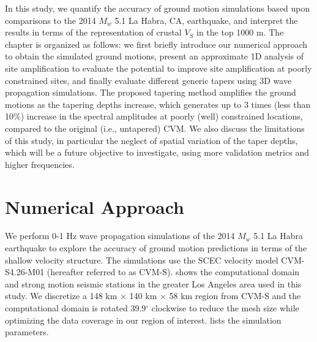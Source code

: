 In this study, we quantify the accuracy of ground motion simulations based upon comparisons to the 2014 $M_w$ 5.1 La Habra, CA, earthquake, and interpret the results in terms of the representation of crustal $V_S$ in the top 1000 m. The chapter is organized as follows: we first briefly introduce our numerical approach to obtain the simulated ground motions, present an approximate 1D analysis of site amplification to evaluate the potential to improve site amplification at poorly constrained sites, and finally evaluate different generic tapers using 3D wave propagation simulations. The proposed tapering method amplifies the ground motions as the tapering depths increase, which generates up to 3 times (less than 10\%) increase in the spectral amplitudes at poorly (well) constrained locations, compared to the original (i.e., untapered) CVM. We also discuss the limitations of this study, in particular the neglect of spatial variation of the taper depths, which will be a future objective to investigate, using more validation metrics and higher frequencies.



\section{Numerical Approach}\label{vs30:approach}
We perform 0-1 Hz wave propagation simulations of the 2014 $M_w$ 5.1 La Habra earthquake to explore the accuracy of ground motion predictions in terms of the shallow velocity structure. The simulations use the SCEC velocity model CVM-S4.26-M01 (hereafter referred to as CVM-S).  shows the computational domain and strong motion seismic stations in the greater Los Angeles area used in this study. We discretize a 148 km $\times$ 140 km $\times$ 58 km region from CVM-S and the computational domain is rotated 39.9$^\circ$ clockwise to reduce the mesh size while optimizing the data coverage in our region of interest.  lists the simulation parameters.

